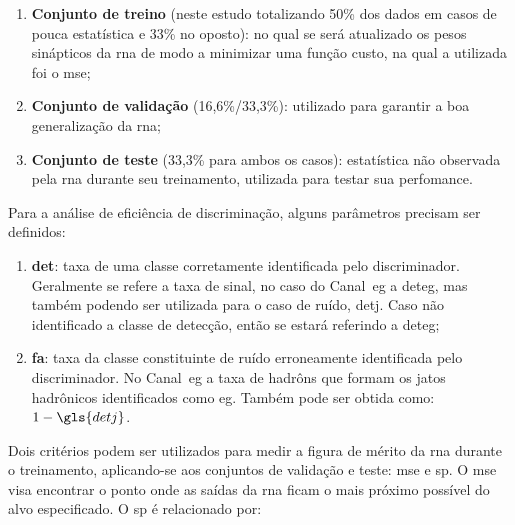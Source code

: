 
\begin{enumerate} 
\item \textbf{Conjunto de treino} (neste estudo totalizando 50\% dos dados em
casos de pouca estatística e 33\% no oposto): 
no qual se será atualizado os pesos sinápticos da \gls{rna} de modo a minimizar uma função 
custo, na qual a utilizada foi o \gls{mse};
\item \textbf{Conjunto de validação} (16,6\%/33,3\%): utilizado para garantir a boa 
generalização da \gls{rna}; 
\item \textbf{Conjunto de teste} (33,3\% para ambos os casos): 
estatística não observada pela \gls{rna} durante seu treinamento, utilizada para 
testar sua perfomance. 
\end{enumerate}

Para a análise de eficiência de discriminação, alguns parâmetros precisam ser definidos:

\begin{enumerate}
\item \textbf{\gls{det}}: taxa de uma classe corretamente identificada pelo
discriminador. Geralmente se refere a taxa de sinal, no caso do Canal~\gls{eg} a
\gls{deteg}, mas também podendo ser utilizada para o caso de ruído, \gls{detj}.
Caso não identificado a classe de detecção, então se estará referindo a
\gls{deteg};
\item \textbf{\gls{fa}}: taxa da classe constituinte de ruído erroneamente
identificada pelo discriminador. No Canal~\gls{eg} a taxa de hadrôns que formam os
jatos hadrônicos identificados como \gls{eg}. Também pode
ser obtida como: $1-\gls{detj}$.
\end{enumerate}


Dois critérios podem ser utilizados para medir a figura de mérito da \gls{rna}
durante o treinamento, aplicando-se aos conjuntos de validação e teste: \gls{mse} 
e \gls{sp}. O \gls{mse} visa encontrar o ponto onde as saídas da \gls{rna} ficam
o mais próximo possível do alvo especificado. O \gls{sp} é relacionado por:

